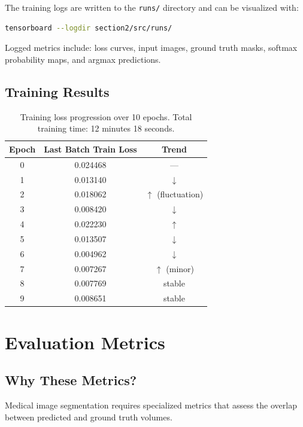 \documentclass[12pt,a4paper]{report}
\begin{document}
The training logs are written to the \texttt{runs/} directory and can be visualized with:
\begin{lstlisting}[language=bash]
tensorboard --logdir section2/src/runs/
\end{lstlisting}

Logged metrics include: loss curves, input images, ground truth masks, softmax probability maps, and argmax predictions.

\section{Training Results}

\begin{table}[H]
\centering
\begin{tabular}{ccc}
\toprule
\textbf{Epoch} & \textbf{Last Batch Train Loss} & \textbf{Trend} \\
\midrule
0 & 0.024468 & --- \\
1 & 0.013140 & $\downarrow$ \\
2 & 0.018062 & $\uparrow$ (fluctuation) \\
3 & 0.008420 & $\downarrow$ \\
4 & 0.022230 & $\uparrow$ \\
5 & 0.013507 & $\downarrow$ \\
6 & 0.004962 & $\downarrow$ \\
7 & 0.007267 & $\uparrow$ (minor) \\
8 & 0.007769 & stable \\
9 & 0.008651 & stable \\
\bottomrule
\end{tabular}
\caption{Training loss progression over 10 epochs. Total training time: 12 minutes 18 seconds.}
\end{table}


\chapter{Evaluation Metrics}

\section{Why These Metrics?}

Medical image segmentation requires specialized metrics that assess the overlap between predicted and ground truth volumes.
\end{document}
